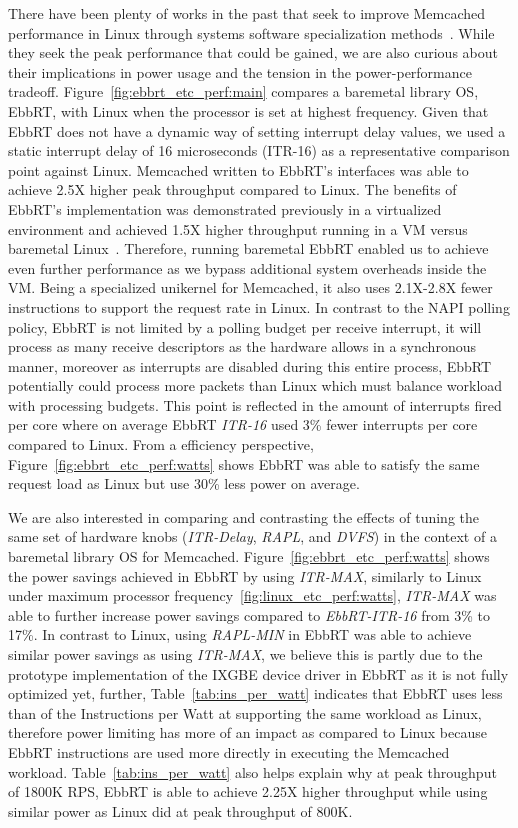 \documentclass[letterpaper,twocolumn,10pt]{article}
\begin{document}
There have been plenty of works in the past that seek to improve Memcached performance in Linux through systems software specialization methods~\cite{mica, ebbrt, ix, mctp, arrakis}. While they seek the peak performance that could be gained, we are also curious about their implications in power usage and the tension in the power-performance tradeoff. Figure~\ref{fig:ebbrt_etc_perf:main} compares a baremetal library OS, EbbRT, with Linux when the processor is set at highest frequency. Given that EbbRT does not have a dynamic way of setting interrupt delay values, we used a static interrupt delay of 16 microseconds (ITR-16) as a representative comparison point against Linux. Memcached written to EbbRT's interfaces was able to achieve 2.5X higher peak throughput compared to Linux. The benefits of EbbRT's implementation was demonstrated previously in a virtualized environment and achieved 1.5X higher throughput running in a VM versus baremetal Linux~\cite{ebbrt}. Therefore, running baremetal EbbRT enabled us to achieve even further performance as we bypass additional system overheads inside the VM. Being a specialized unikernel for Memcached, it also uses 2.1X-2.8X fewer instructions to support the request rate in Linux. In contrast to the NAPI polling policy, EbbRT is not limited by a polling budget per receive interrupt, it will process as many receive descriptors as the hardware allows in a synchronous manner, moreover as interrupts are disabled during this entire process, EbbRT potentially could process more packets than Linux which must balance workload with processing budgets. This point is reflected in the amount of interrupts fired per core where on average EbbRT \textit{ITR-16} used 3\% fewer interrupts per core compared to Linux. From a efficiency perspective, Figure~\ref{fig:ebbrt_etc_perf:watts} shows EbbRT was able to satisfy the same request load as Linux but use 30\% less power on average.

We are also interested in comparing and contrasting the effects of tuning the same set of hardware knobs (\textit{ITR-Delay}, \textit{RAPL}, and \textit{DVFS}) in the context of a baremetal library OS for Memcached. Figure~\ref{fig:ebbrt_etc_perf:watts} shows the power savings achieved in EbbRT by using \textit{ITR-MAX}, similarly to Linux under maximum processor frequency~\ref{fig:linux_etc_perf:watts}, \textit{ITR-MAX} was able to further increase power savings compared to \textit{EbbRT-ITR-16} from 3\% to 17\%. In contrast to Linux, using \textit{RAPL-MIN} in EbbRT was able to achieve similar power savings as using \textit{ITR-MAX}, we believe this is partly due to the prototype implementation of the IXGBE device driver in EbbRT as it is not fully optimized yet, further, Table~\ref{tab:ins_per_watt} indicates that EbbRT uses less than of the Instructions per Watt at supporting the same workload as Linux, therefore power limiting has more of an impact as compared to Linux because EbbRT instructions are used more directly in executing the Memcached workload. Table~\ref{tab:ins_per_watt} also helps explain why at peak throughput of 1800K RPS, EbbRT is able to achieve 2.25X higher throughput while using similar power as Linux did at peak throughput of 800K.
\end{document}
